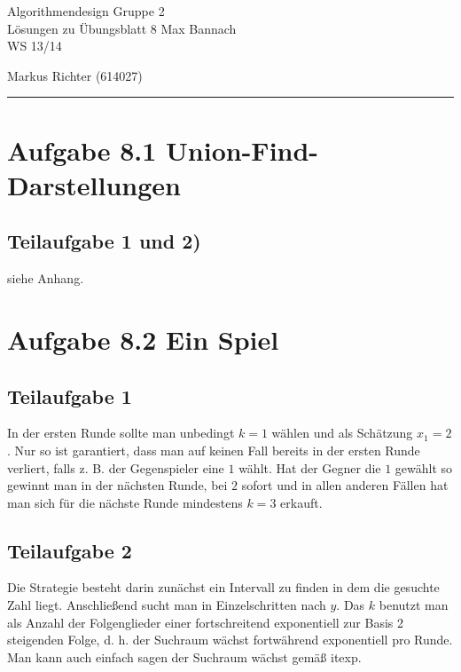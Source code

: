 \documentclass[a4paper, fontsize=10pt]{scrartcl}
\begin{document}
 

{\huge{Algorithmendesign} \hfill \large{ Gruppe 2}}\\  
{\large Lösungen zu Übungsblatt 8} \hfill Max Bannach\\
{\large WS 13/14}
\begin{flushright}Markus Richter (614027)\end{flushright}
\rule{\textwidth}{.3mm}

\section*{Aufgabe 8.1 Union-Find-Darstellungen}
\subsection*{Teilaufgabe 1 und 2)}
siehe Anhang.

\section*{Aufgabe 8.2 Ein Spiel}

\subsection*{Teilaufgabe 1}
In der ersten Runde sollte man unbedingt $k=1$ wählen und als Schätzung $x_1=2$. Nur so ist garantiert, dass man auf keinen Fall bereits in der ersten Runde verliert, falls z. B. der Gegenspieler eine $1$ wählt. Hat der Gegner die $1$ gewählt so gewinnt man in der nächsten Runde, bei $2$ sofort und in allen anderen Fällen hat man sich für die nächste Runde mindestens $k=3$ erkauft. 

\subsection*{Teilaufgabe 2}
Die Strategie besteht darin zunächst ein Intervall zu finden in dem die gesuchte Zahl liegt. Anschließend sucht man in Einzelschritten nach $y$. Das $k$ benutzt man als Anzahl der Folgenglieder einer fortschreitend exponentiell zur Basis 2 steigenden Folge, d. h. der Suchraum wächst fortwährend exponentiell pro Runde. Man kann auch einfach sagen der Suchraum wächst gemäß itexp. \smallskip
\end{document}
